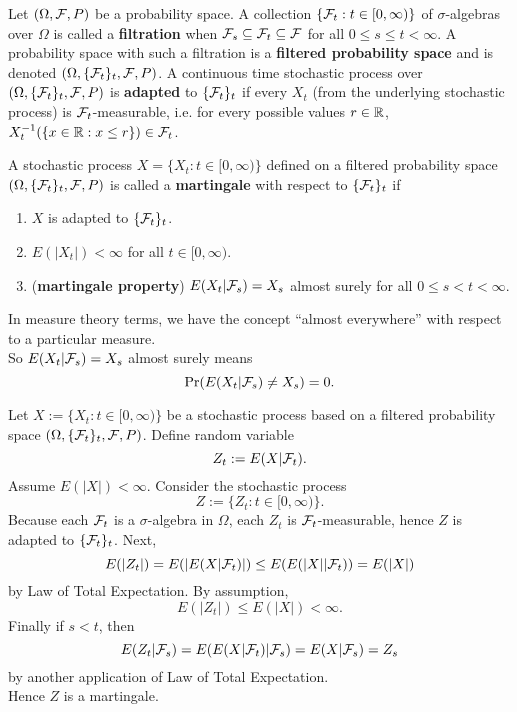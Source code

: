 \documentclass[11pt,fleqn]{book} %
\begin{document}
\begin{definition} \label{def:313}
Let \((\Omega, \mathcal{F}, P)\) be a probability space. A collection \(\{\mathcal{F}_t: t \in [0, \infty)\}\) of \(\sigma\)-algebras over \(\Omega\) is called a \textbf{filtration} when \(\mathcal{F}_s \subseteq \mathcal{F}_t \subseteq \mathcal{F}\) for all \(0 \leq s \leq t < \infty\). A probability space with such a filtration is a \textbf{filtered probability space} and is denoted \((\Omega, \{\mathcal{F}_t\}_t, \mathcal{F}, P)\). A continuous time stochastic process over \((\Omega, \{\mathcal{F}_t\}_t, \mathcal{F}, P)\) is \textbf{adapted} to \(\{\mathcal{F}_t\}_t\) if every \(X_t\) (from the underlying stochastic process) is \(\mathcal{F}_t\)-measurable, i.e. for every possible values \(r \in \mathbb{R}\), \(X_t^{-1}(\{x \in \mathbb{R}: x \leq r\}) \in \mathcal{F}_t\).
\end{definition}

\begin{definition} \label{def:314}
A stochastic process \(X = \{X_t: t \in [0, \infty)\}\) defined on a filtered probability space \((\Omega, \{\mathcal{F}_t\}_t, \mathcal{F}, P)\) is called a \textbf{martingale} with respect to \(\{\mathcal{F}_t\}_t\) if
\begin{enumerate}
\item \(X\) is adapted to \(\{\mathcal{F}_t\}_t\).
\item \(E(|X_t|) < \infty\) for all \(t \in [0, \infty)\). 
\item (\textbf{martingale property}) \(E(X_t | \mathcal{F}_s) = X_s\) almost surely for all \(0 \leq s < t < \infty\).
\end{enumerate}
\end{definition}

\begin{remark} \label{rmk:315}
In measure theory terms, we have the concept ``almost everywhere'' with respect to a particular measure. \\
\indent So \(E(X_t|\mathcal{F}_s) = X_s\) almost surely means
\[
\Pr(E(X_t|\mathcal{F}_s) \neq X_s) = 0.
\]
\end{remark}

\begin{example} \label{eg:316}
Let \(X := \{X_t: t \in [0, \infty)\}\) be a stochastic process based on a filtered probability space \((\Omega, \{\mathcal{F}_t\}_t, \mathcal{F}, P)\). Define random variable
\[
Z_t := E(X | \mathcal{F}_t).
\]
\indent Assume \(E(|X|) < \infty\). Consider the stochastic process
\[
Z := \{Z_t: t \in [0, \infty)\}.
\]
\indent Because each \(\mathcal{F}_t\) is a \(\sigma\)-algebra in \(\Omega\), each \(Z_t\) is \(\mathcal{F}_t\)-measurable, hence \(Z\) is adapted to \(\{\mathcal{F}_t\}_t\). Next,
\[
E(|Z_t|) = E(|E(X | \mathcal{F}_t)|) \leq E(E(|X| | \mathcal{F}_t)) = E(|X|)
\]
by Law of Total Expectation. By assumption,
\[
E(|Z_t|) \leq E(|X|) < \infty.
\]
\indent Finally if \(s < t\), then
\[
E(Z_t|\mathcal{F}_s) = E(E(X|\mathcal{F}_t)|\mathcal{F}_s) = E(X|\mathcal{F}_s) = Z_s
\]
by another application of Law of Total Expectation. \\
\indent Hence \(Z\) is a martingale.
\end{example}
\end{document}
